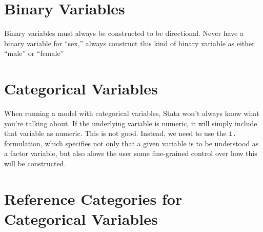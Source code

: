 \section{Binary Variables}

Binary variables must always be constructed to be directional. Never
have a binary variable for ``sex,'' always construct this kind of
binary variable as either ``male'' or ``female'' 



\section{Categorical Variables}

When running a model with categorical variables, Stata won't always
know what you're talking about. If the underlying variable is numeric,
it will simply include that variable as numeric. This is not
good. Instead, we need to use the \texttt{i.} formulation, which
specifies not only that a given variable is to be understood as a
factor variable, but also alows the user some fine-grained control
over how this will be constructed. 


\section{Reference Categories for Categorical Variables}


